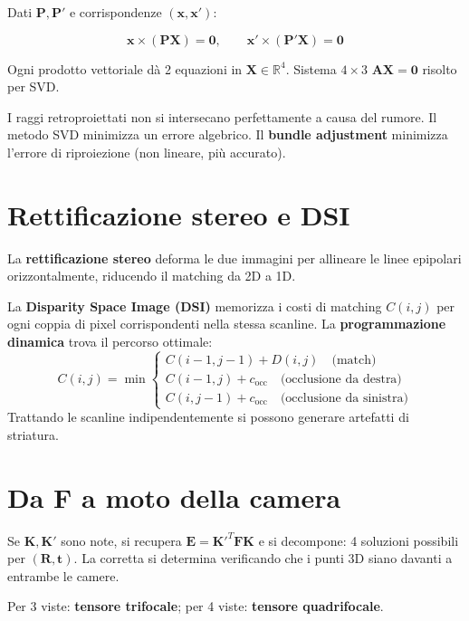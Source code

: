 \documentclass[12pt, a4paper]{report}
\newcommand{\R}{\mathbb{R}}
\begin{document}
Dati $\mathbf{P},\mathbf{P}'$ e corrispondenze $(\mathbf{x},\mathbf{x}')$:

\[
  \mathbf{x}\times(\mathbf{PX})=\mathbf{0}, \qquad
  \mathbf{x}'\times(\mathbf{P'X})=\mathbf{0}
\]

Ogni prodotto vettoriale dà 2 equazioni in $\mathbf{X}\in\R^4$.
Sistema $4\times3$ $\mathbf{AX}=\mathbf{0}$ risolto per SVD.

\begin{warnbox}
I raggi retroproiettati non si intersecano perfettamente a causa del rumore.
Il metodo SVD minimizza un errore algebrico. Il \textbf{bundle adjustment}
minimizza l'errore di riproiezione (non lineare, più accurato).
\end{warnbox}

\section{Rettificazione stereo e DSI}

La \textbf{rettificazione stereo} deforma le due immagini per allineare le linee
epipolari orizzontalmente, riducendo il matching da 2D a 1D.

La \textbf{Disparity Space Image (DSI)} memorizza i costi di matching
$C(i,j)$ per ogni coppia di pixel corrispondenti nella stessa scanline.
La \textbf{programmazione dinamica} trova il percorso ottimale:
\[
  C(i,j)=\min\begin{cases}C(i-1,j-1)+D(i,j)\quad\text{(match)}\\C(i-1,j)+c_{\mathrm{occ}}\quad\text{(occlusione da destra)}\\C(i,j-1)+c_{\mathrm{occ}}\quad\text{(occlusione da sinistra)}\end{cases}
\]
Trattando le scanline indipendentemente si possono generare artefatti di striatura.

\section{Da $\mathbf{F}$ a moto della camera}

Se $\mathbf{K},\mathbf{K}'$ sono note, si recupera $\mathbf{E}=\mathbf{K}'^T\mathbf{FK}$
e si decompone: 4 soluzioni possibili per $(\mathbf{R},\mathbf{t})$.
La corretta si determina verificando che i punti 3D siano davanti a entrambe le
camere.

Per 3 viste: \textbf{tensore trifocale}; per 4 viste: \textbf{tensore quadrifocale}.

\end{document}
